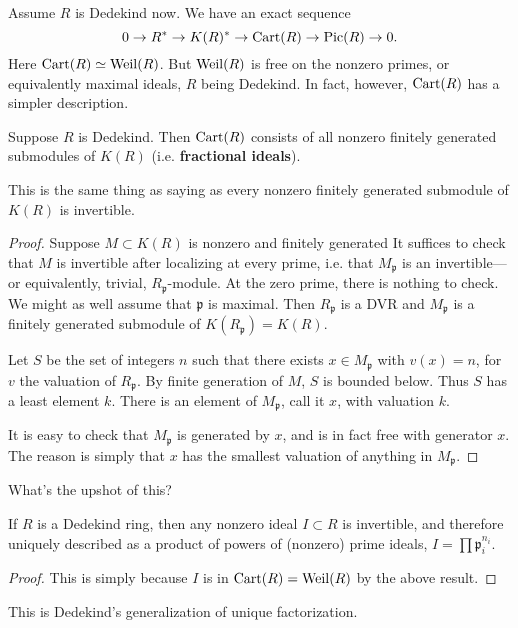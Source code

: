 Assume $R$ is Dedekind now.
We have an exact sequence
\[ 0 \to R^* \to K(R)^* \to \operatorname{Cart}(R) \to \operatorname{Pic}(R) \to 0.  \]
Here $\operatorname{Cart}(R) \simeq \operatorname{Weil}(R)$. But $\operatorname{Weil}(R)$ is free on the nonzero
primes, or equivalently maximal ideals, $R$ being Dedekind. 
In fact, however, $\operatorname{Cart}(R)$ has a simpler description.

\begin{proposition} 
Suppose $R$ is Dedekind. Then $\operatorname{Cart}(R)$ consists of all nonzero finitely generated
submodules of $K(R)$ (i.e. \textbf{fractional ideals}). 
\end{proposition} 

This is the same thing as saying as every nonzero finitely generated submodule of $K(R)$ is
invertible.
\begin{proof} 
Suppose $M \subset K(R)$ is nonzero and finitely generated It suffices to check that $M$ is
invertible after localizing at every prime, i.e. that $M_{\mathfrak{p}}$ is
an invertible---or equivalently, trivial, $R_{\mathfrak{p}}$-module. At the
zero prime, there is nothing to check. We might as well assume that
$\mathfrak{p}$ is maximal. Then $R_{\mathfrak{p}}$ is a DVR and
$M_{\mathfrak{p}}$ is a finitely generated submodule of $K(R_{\mathfrak{p}}) = K(R)$. 

Let $S$ be the set of integers $n$ such that there exists $ x \in
M_{\mathfrak{p}}$ with $v(x) = n$, for $v$ the valuation of $R_{\mathfrak{p}}$.
By finite generation of $M$, $S$ is bounded below. Thus $S$ has a least element
$k$. There is an element of $M_{\mathfrak{p}}$, call it $x$, with valuation $k$.

It is easy to check that $M_{\mathfrak{p}}$ is generated by $x$, and is in fact free with
generator $x$. The reason is simply that $x$ has the smallest valuation of
anything in $M_{\mathfrak{p}}$.
\end{proof} 

What's the upshot of this?

\begin{theorem}
If $R$ is a Dedekind ring, then any nonzero ideal $I \subset R$ is invertible,
and therefore uniquely described as a product of powers of (nonzero) prime ideals, $I =
\prod \mathfrak{p}_i^{n_i}$.
\end{theorem} 
\begin{proof} 
This is simply because $I$ is in $\operatorname{Cart}(R) = \operatorname{Weil}(R)$ by the above result. 
\end{proof} 

This is Dedekind's generalization of unique factorization.

